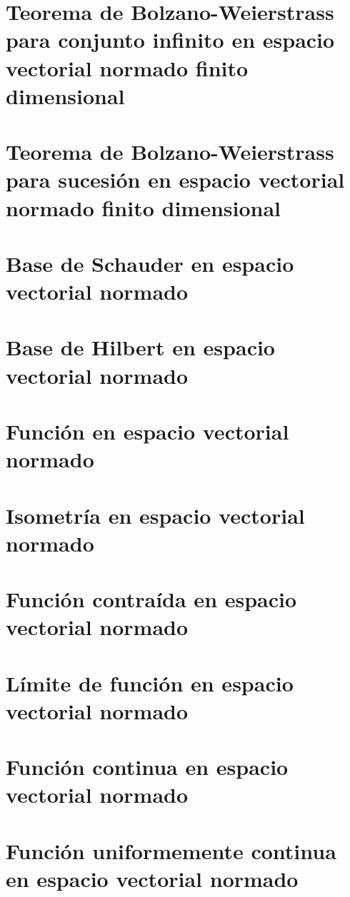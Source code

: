 \section{Teorema de Bolzano-Weierstrass para conjunto infinito en espacio vectorial normado finito dimensional}

\section{Teorema de Bolzano-Weierstrass para sucesión en espacio vectorial normado finito dimensional}

\section{Base de Schauder en espacio vectorial normado}

\section{Base de Hilbert en espacio vectorial normado}

\section{Función en espacio vectorial normado}

\section{Isometría en espacio vectorial normado}

\section{Función contraída en espacio vectorial normado}

\section{Límite de función en espacio vectorial normado}

\section{Función continua en espacio vectorial normado}

\section{Función uniformemente continua en espacio vectorial normado}

